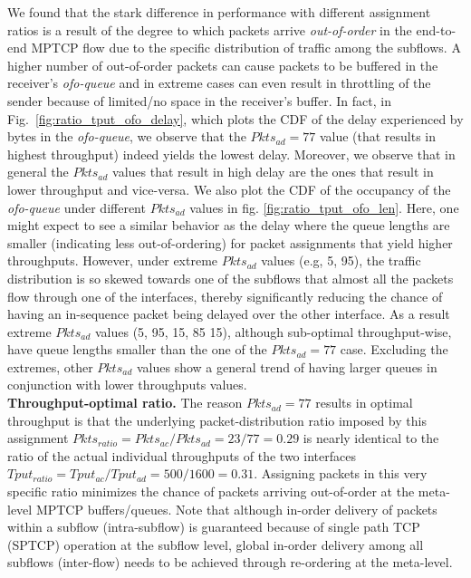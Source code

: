 We found that the stark difference in performance with different
assignment ratios is a result of the degree to which packets arrive
\textit{out-of-order} in the end-to-end MPTCP flow due to
the specific distribution of traffic among the subflows.
A higher number of out-of-order packets can cause
packets to be buffered in the receiver's \emph{ofo-queue} and in
extreme cases can even result in throttling of the sender because of
limited/no space in the receiver's buffer. In fact, in
Fig.~\ref{fig:ratio_tput_ofo_delay}, which plots the CDF of the delay
experienced by bytes in the \emph{ofo-queue}, we observe that
the $Pkts_{ad}=77$ value (that results in highest throughput) indeed
yields the lowest delay. Moreover, we observe that in general the
$Pkts_{ad}$ values that result in high delay are the ones that result
in lower throughput and vice-versa. 
We also plot the CDF of the
occupancy of the \emph{ofo-queue} under different $Pkts_{ad}$
values in fig. \ref{fig:ratio_tput_ofo_len}. Here, one might expect to
see a similar behavior as the delay where the queue lengths are smaller
(indicating less out-of-ordering) for packet assignments that yield
higher throughputs. However, under extreme $Pkts_{ad}$ values
(e.g, 5, 95), the traffic distribution is so skewed towards one of
the subflows that almost all the packets flow through one of
the interfaces, thereby significantly reducing the chance of having an
in-sequence packet being delayed over the other interface. As a result
extreme $Pkts_{ad}$ values (5, 95, 15, 85 15), although sub-optimal
throughput-wise, have queue lengths smaller than the one of the $Pkts_{ad}=77$ case.
Excluding the extremes, other $Pkts_{ad}$ values show a general trend of
having larger queues in conjunction with lower throughputs values.
\fi
\\
\noindent\textbf{Throughput-optimal ratio.} The reason $Pkts_{ad}=77$ results in optimal throughput is that
the underlying packet-distribution ratio imposed by this assignment
$Pkts_{ratio}=Pkts_{ac}/Pkts_{ad}=23/77=0.29$ is nearly identical to
the ratio of the actual individual throughputs of the two interfaces
$Tput_{ratio}=Tput_{ac}/Tput_{ad}=500/1600=0.31$. Assigning packets in
this very specific ratio minimizes the chance of packets arriving
out-of-order at the meta-level MPTCP buffers/queues. Note that
although in-order delivery of packets within a subflow (intra-subflow)
is guaranteed because of single path TCP (SPTCP) operation at the subflow level,
global in-order delivery among all subflows (inter-flow) needs
to be achieved through re-ordering at the meta-level.
